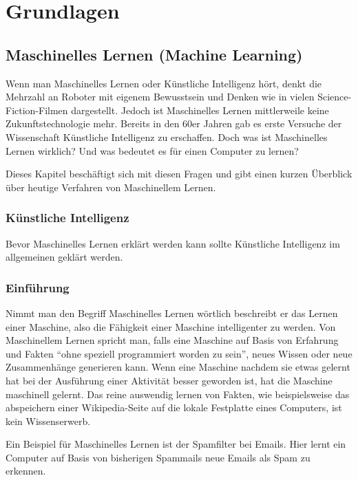 \chapter{Grundlagen}

\section{Maschinelles Lernen (Machine Learning)}

    Wenn man Maschinelles Lernen oder Künstliche Intelligenz hört, denkt die Mehrzahl an Roboter mit eigenem Bewusstsein und Denken wie in vielen Science-Fiction-Filmen dargestellt.
    Jedoch ist Maschinelles Lernen mittlerweile keine Zukunftstechnologie mehr.
    Bereits in den 60er Jahren gab es erste Versuche der Wissenschaft Künstliche Intelligenz zu erschaffen.
    Doch was ist Maschinelles Lernen wirklich? Und was bedeutet es für einen Computer zu lernen?
    \newline

    \noindent
    Dieses Kapitel beschäftigt sich mit diesen Fragen und gibt einen kurzen Überblick über heutige Verfahren von Maschinellem Lernen.

    \subsection{Künstliche Intelligenz}
    Bevor Maschinelles Lernen erklärt werden kann sollte Künstliche Intelligenz im allgemeinen geklärt werden.


    \subsection{Einführung}
    Nimmt man den Begriff Maschinelles Lernen wörtlich beschreibt er das Lernen einer Maschine, also die Fähigkeit einer Maschine intelligenter zu werden.
    Von Maschinellem Lernen spricht man, falls eine Maschine auf Basis von Erfahrung und Fakten "`ohne speziell programmiert worden zu sein"'\cite[20]{HandsOnML}, neues Wissen oder neue Zusammenhänge generieren kann.
    Wenn eine Maschine nachdem sie etwas gelernt hat bei der Ausführung einer Aktivität besser geworden ist, hat die Maschine maschinell gelernt\cite[20]{HandsOnML}.
    Das reine auswendig lernen von Fakten, wie beispielsweise das abspeichern einer Wikipedia-Seite auf die lokale Festplatte eines Computers, ist kein Wissenserwerb.
    \newline

    \noindent
    Ein Beispiel für Maschinelles Lernen ist der Spamfilter bei Emails.
    Hier lernt ein Computer auf Basis von bisherigen Spammails neue Emails als Spam zu erkennen.
    \newline

